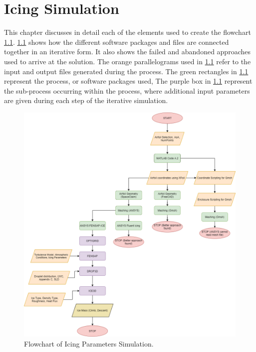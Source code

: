 \documentclass[english]{kththesis}
\begin{document}
\chapter{Icing Simulation}
This chapter discusses in detail each of the elements used to create the flowchart \ref{fig:icingsim}. \ref{fig:icingsim} shows how the different software packages and files are connected together in an iterative form. It also shows the failed and abandoned approaches used to arrive at the solution. The orange parallelograms used in \ref{fig:icingsim} refer to the input and output files generated during the process. The green rectangles in \ref{fig:icingsim} represent the process, or software packages used, The purple box in \ref{fig:icingsim} represent the sub-process occurring within the process, where additional input parameters are given during each step of the iterative simulation.
\begin{figure}[!htb]
    \centering
    \includegraphics[width=1\textwidth]{IPS/Icing Simulation.png}
    \caption{Flowchart of Icing Parameters Simulation.}
    \label{fig:icingsim}
\end{figure}
\end{document}
